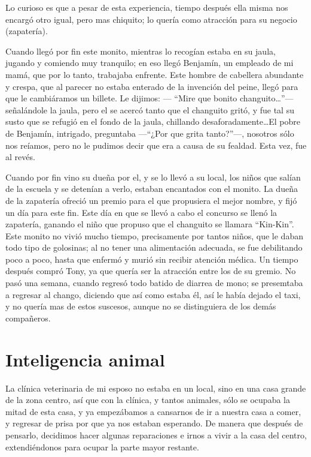 \documentclass[letterpaper, 12pt]{book}
\begin{document}
Lo curioso es que a pesar de esta experiencia, tiempo después ella misma nos encargó otro igual, pero mas chiquito; lo quería como atracción para su negocio (zapatería).

Cuando llegó por fin este monito, mientras lo recogían estaba en su jaula, jugando y comiendo muy tranquilo; en eso llegó Benjamín, un empleado de mi mamá, que por lo tanto, trabajaba enfrente. Este hombre de cabellera abundante y crespa, que al parecer no estaba enterado de la invención del peine, llegó para que le cambiáramos un billete. Le dijimos: --- ``Mire que bonito changuito\ldots''--- señalándole la jaula, pero el se acercó tanto que el changuito gritó, y fue tal su susto que se refugió en el fondo de la jaula, chillando desaforadamente\ldots El pobre de Benjamín, intrigado, preguntaba ---``¿Por que grita tanto?''---, nosotros sólo nos reíamos, pero no le pudimos decir que era a causa de su fealdad. Esta vez, fue al revés.

Cuando por fin vino su dueña por el, y se lo llevó a su local, los niños que salían de la escuela y se detenían a verlo, estaban encantados con el monito. La dueña de la zapatería ofreció un premio para el que propusiera el mejor nombre, y fijó un día para este fin.
Este día en que se llevó a cabo el concurso se llenó la zapatería, ganando el niño que propuso que el changuito se llamara ``Kin-Kin''.  Este monito no vivió mucho tiempo, precisamente por tantos niños, que le daban todo tipo de golosinas; al no tener una alimentación adecuada, se fue debilitando poco a poco, hasta que enfermó y murió sin recibir atención médica.
Un tiempo después compró Tony, ya que quería ser la atracción entre los de su gremio. No pasó una semana, cuando regresó todo batido de diarrea de mono; se presemtaba a  regresar al chango, diciendo que así como estaba él, así le había dejado el taxi, y no quería mas de estos suscesos, aunque no se distinguiera de los demás compañeros.
\chapter{Inteligencia animal}
La clínica veterinaria de mi esposo no estaba en un local, sino en una casa grande de la zona centro, así que con la clínica, y tantos animales, sólo se ocupaba la mitad de esta casa, y ya empezábamos a cansarnos de ir a nuestra casa a comer, y regresar de prisa por que ya nos estaban esperando.
De manera que después de pensarlo, decidimos hacer algunas reparaciones e irnos a vivir a la casa del centro, extendiéndonos para ocupar la parte mayor restante.
\end{document}
